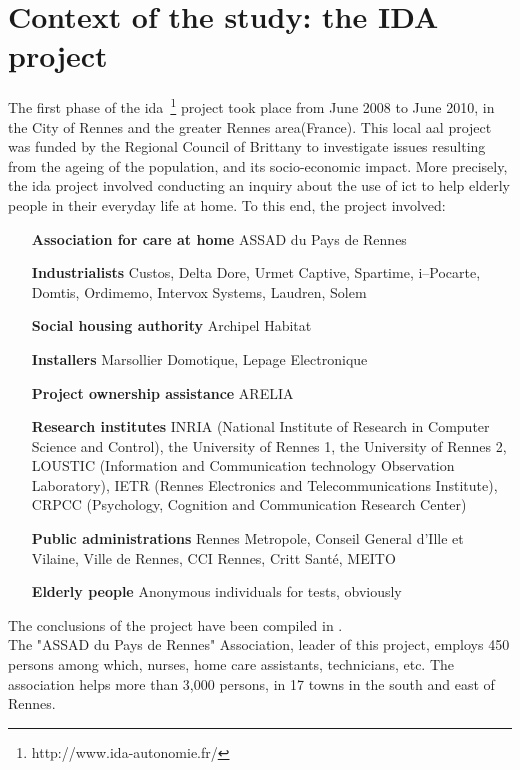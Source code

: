 \section{Context of the study: the IDA project}

The first phase of the \gls{ida}~\footnote{http://www.ida-autonomie.fr/} project took place from June 2008 to June 2010, in the City of Rennes and the greater Rennes area(France). This local \gls{aal} project was funded by the Regional Council of Brittany to investigate issues resulting from the ageing of the population, and its socio-economic impact. More precisely, the \gls{ida} project involved conducting an inquiry about the use of \gls{ict} to help elderly people in their everyday life at home. To this end, the project involved:\\
\begin{itemize}
\item[{\bf Association for care at home}] ASSAD du Pays de Rennes
\item[{\bf Industrialists}] Custos, Delta Dore, Urmet Captive, Spartime, i--Pocarte, Domtis, Ordimemo, Intervox Systems, Laudren, Solem
\item[{\bf Social housing authority}] Archipel Habitat
\item[{\bf Installers}] Marsollier Domotique, Lepage Electronique
\item[{\bf Project ownership assistance}] ARELIA
\item[{\bf Research institutes}] INRIA (National Institute of Research in Computer Science and Control), the University of Rennes 1, the University of Rennes 2, LOUSTIC (Information and Communication technology Observation Laboratory), IETR (Rennes Electronics and Telecommunications Institute), CRPCC (Psychology, Cognition and Communication Research Center)
\item[{\bf Public administrations}] Rennes Metropole, Conseil General d'Ille et Vilaine, Ville de Rennes, CCI Rennes, Critt Santé, MEITO
\item[{\bf Elderly people}] Anonymous individuals for tests, obviously
\end{itemize}
The conclusions of the project have been compiled in \cite{ASSAD:2010}.\\

The "ASSAD du Pays de Rennes" Association, leader of this project, employs 450 persons among which, nurses, home care assistants, technicians, etc. The association helps more than 3,000 persons, in 17 towns in the south and east of Rennes.\\

